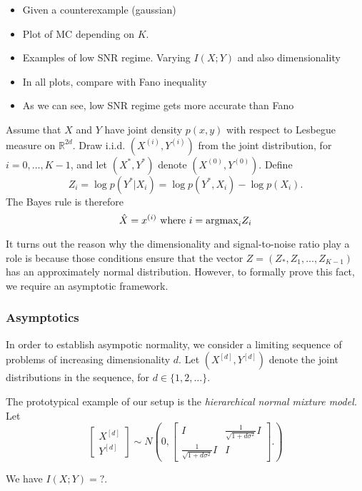 \documentclass[12pt]{article}
\begin{document}
\begin{itemize}
\item Given a counterexample (gaussian)
\item Plot of $\text{MC}$ depending on $K$.
\item Examples of low SNR regime.  Varying $I(X;Y)$ and also dimensionality 
\item In all plots, compare with Fano inequality
\item As we can see, low SNR regime gets more accurate than Fano
\end{itemize}

Assume that $X$ and $Y$ have joint density $p(x, y)$ with respect to
Lesbegue measure on $\mathbb{R}^{2d}$.  Draw i.i.d. $(X^{(i)},
Y^{(i)})$ from the joint distribution, for $i = 0,\hdots, K-1$, and let
$(X^*, Y^*)$ denote $(X^{(0)}, Y^{(0)})$.  Define
\[
Z_i = \log p(Y^*|X_i) = \log p(Y^*, X_i) - \log p(X_i).
\]
The Bayes rule is therefore
\[
\hat{X} = x^{(i)} \text{ where }i = \text{argmax}_i Z_i
\]

It turns out the reason why the dimensionality and signal-to-noise
ratio play a role is because those conditions ensure that the vector
$Z = (Z_*, Z_1,\hdots, Z_{K-1})$ has an approximately normal
distribution.  However, to formally prove this fact, we require an
asymptotic framework.

\subsubsection{Asymptotics}

In order to establish asympotic normality, we consider a limiting
sequence of problems of increasing dimensionality $d$.  Let $(X^{[d]},
Y^{[d]})$ denote the joint distributions in the sequence, for
$d \in \{1, 2, \hdots\}.$ 

The prototypical example of our setup is the \emph{hierarchical normal mixture model.}
Let
\[
\begin{bmatrix}
X^{[d]}\\Y^{[d]}
\end{bmatrix} \sim 
N\left(
0, \begin{bmatrix}
I & \frac{1}{\sqrt{1 + d\sigma^2}}I \\
\frac{1}{\sqrt{1 + d\sigma^2}} I & I
\end{bmatrix}.
\right)
\]

We have $I(X;Y) = ?$.
\end{document}
